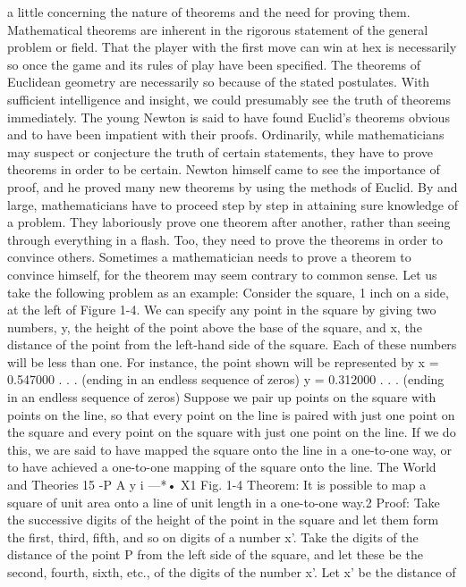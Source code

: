 a little concerning the nature of theorems and the need
for proving them.
Mathematical theorems are inherent in the rigorous statement
of the general problem or field. That the player with the first move
can win at hex is necessarily so once the game and its rules of play
have been specified. The theorems of Euclidean geometry are
necessarily so because of the stated postulates.
With sufficient intelligence and insight, we could presumably see
the truth of theorems immediately. The young Newton is said to
have found Euclid’s theorems obvious and to have been impatient
with their proofs.
Ordinarily, while mathematicians may suspect or conjecture the
truth of certain statements, they have to prove theorems in order
to be certain. Newton himself came to see the importance of proof,
and he proved many new theorems by using the methods of Euclid.
By and large, mathematicians have to proceed step by step in
attaining sure knowledge of a problem. They laboriously prove one
theorem after another, rather than seeing through everything in a
flash. Too, they need to prove the theorems in order to convince
others.
Sometimes a mathematician needs to prove a theorem to convince
himself, for the theorem may seem contrary to common
sense. Let us take the following problem as an example: Consider
the square, 1 inch on a side, at the left of Figure 1-4. We can specify
any point in the square by giving two numbers, y, the height of
the point above the base of the square, and x, the distance of the
point from the left-hand side of the square. Each of these numbers
will be less than one. For instance, the point shown will be represented
by
x = 0.547000 . . . (ending in an endless sequence of zeros)
y = 0.312000 . . . (ending in an endless sequence of zeros)
Suppose we pair up points on the square with points on the line,
so that every point on the line is paired with just one point on the
square and every point on the square with just one point on the
line. If we do this, we are said to have mapped the square onto
the line in a one-to-one way, or to have achieved a one-to-one mapping
of the square onto the line.
The World and Theories 15
-P
A
y i
—*•
X1
Fig. 1-4
Theorem: It is possible to map a square of unit area onto a line
of unit length in a one-to-one way.2
Proof: Take the successive digits of the height of the point in
the square and let them form the first, third, fifth, and so on digits
of a number x'. Take the digits of the distance of the point P from
the left side of the square, and let these be the second, fourth,
sixth, etc., of the digits of the number x'. Let x' be the distance of
